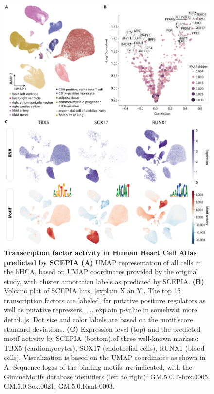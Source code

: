\begin{figure}
    \centering
    \includegraphics[width=0.75\linewidth]{ch.scepia/imgs/SCEPIA_allCells_v10_Myriad_Figure3.png}
    \caption{\textbf{Transcription factor activity in Human Heart Cell Atlas predicted by SCEPIA} \textbf{(A)} UMAP representation of all cells in the hHCA, based on UMAP coordinates provided by the original study\cite{Kanemaru2023}, with cluster annotation labels as predicted by SCEPIA. \textbf{(B) }Volcano plot of SCEPIA hits, [explain X an Y]. The top 15 transcription factors are labeled, for putative posituve regulators as well as putative repressers. [... explain p-value in somehwat more detail..]s. Dot size and color labels are based on the motif score standard deviations.  \textbf{(C) }Expression level (top) and the predicted motif activity by SCEPIA (bottom),of three well-known markers: TBX5 (cardiomyocytes), SOX17 (endothelial cells), RUNX1 (blood cells). Visualization is based on the UMAP coordinates as shown in A. Sequence logos of the binding motifs are indicated, with the GimmeMotifs database identifiers (left to right): GM.5.0.T-box.0005, GM.5.0.Sox.0021, GM.5.0.Runt.0003. }
    \label{fig:scepia_hhca1}
\end{figure}


